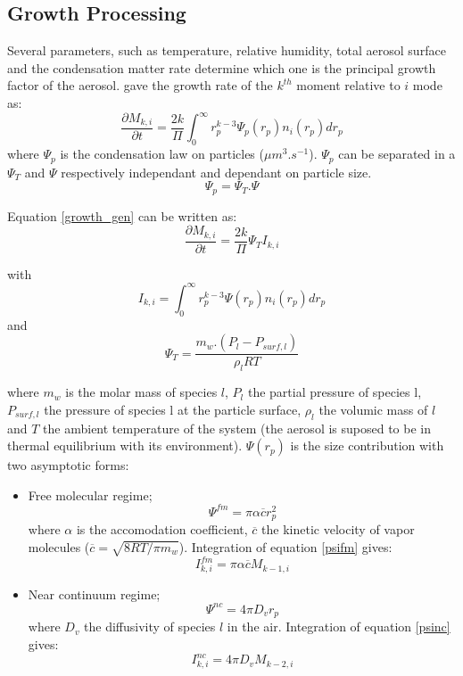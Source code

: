 \subsection{Growth Processing}
Several parameters, such as temperature, relative humidity, total aerosol surface and 
the condensation matter rate determine which one is the principal growth factor 
of the aerosol.  
\citet{Whitby-1991} gave the growth rate of the $k^{th}$ moment relative to $i$ 
mode as:
\begin{equation}
\frac{\partial M_{k,i}}{\partial t} = \frac{2 k}{\Pi} \int_{0}^{\infty} r_p^{k-
3} \Psi_p(r_p)n_i(r_p) dr_p
\label{growth_gen}
\end{equation}
where $\Psi_p$ is the condensation law on particles ($\mu m^3.s^{-1}$). $\Psi_p$ 
can be separated in a $\Psi_T$ and $\Psi$ respectively independant and dependant 
on particle size.
\begin{equation}
\Psi_p = \Psi_T . \Psi
\label{psi}
\end{equation}

Equation \ref{growth_gen} can be written as:
\begin{equation}
\frac{\partial M_{k,i}}{\partial t} = \frac{2 k}{\Pi} \Psi_T I_{k,i}
\label{growth_sec}
\end{equation}

with 
\begin{equation}
I_{k,i} = \int_{0}^{\infty} r_p^{k-3} \Psi(r_p) n_i(r_p) dr_p
\label{ik}
\end{equation}
and 
\begin{equation}
\Psi_T = \frac{m_w . (P_l - P_{surf,l})}{\rho_l R T}
\label{psit}
\end{equation}

where $m_w$ is the molar mass of species $l$, $P_l$ the partial pressure of 
species l, $P_{surf,l}$ the pressure of species l at the particle surface,  
$\rho_l$ the volumic mass of $l$ and $T$ the ambient temperature of 
the system (the aerosol is suposed to be in thermal equilibrium with its 
environment).
$\Psi(r_p)$ is the size contribution with two asymptotic forms:
\begin{itemize}
\item Free molecular regime;
\begin{equation}
\Psi^{fm} = \pi \alpha \overline{c} r_p^2
\label{psifm}
\end{equation}
where $\alpha$ is the accomodation coefficient, $\overline{c}$ the kinetic 
velocity of vapor molecules ($\overline{c} = \sqrt{8 RT/\pi m_w}$).
Integration of equation \ref{psifm} gives:
\begin{equation}
I^{fm}_{k,i} = \pi \alpha \overline{c} M_{k-1,i}
\label{psifmint}
\end{equation}
\item Near continuum regime;
\begin{equation}
\Psi^{nc} = 4 \pi D_v r_p
\label{psinc}
\end{equation}
where $D_v$ the diffusivity of species $l$ in the air.
Integration of equation \ref{psinc} gives:
\begin{equation}
I^{nc}_{k,i} = 4 \pi D_v M_{k-2,i}
\label{psincint}
\end{equation}
\end{itemize}

